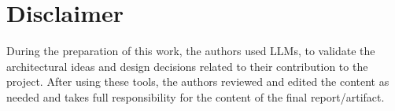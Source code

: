 \section*{Disclaimer}
During the preparation of this work, the authors used LLMs, to validate the architectural ideas and design decisions related to their contribution to the project.
After using these tools, the authors reviewed and edited the content as needed and takes full responsibility for the content of the final report/artifact.